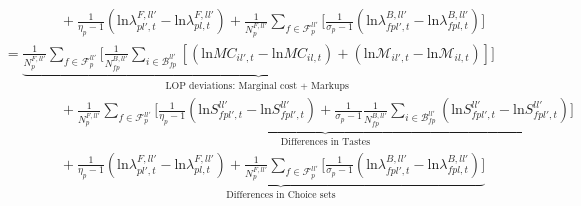 \begin{linenomath*}
\begin{equation*}
\begin{aligned}
            & \qquad \qquad
                +   \frac{1}{\eta_p-1} 
                        \left(\text{ln} \lambda^{F,ll'}_{pl',t} - \text{ln}\lambda^{F,ll'}_{pl,t} \right)
                    + \frac{1}{N^{F,ll'}_{p}} \sum_{f \in \mathcal{F}^{ll'}_{p}} 
                    \Bigg[
                        \frac{1}{\sigma_p-1} 
                        \left(\text{ln} \lambda^{B,ll'}_{fpl',t} - \text{ln}\lambda^{B,ll'}_{fpl,t} \right)  
                    \Bigg] \\
            &=  \underbrace{\frac{1}{N^{F,ll'}_{p}} \sum_{f \in \mathcal{F}^{ll'}_{p}} 
                    \Bigg[
                        \frac{1}{N^{B,ll'}_{fp}} \sum_{i \in \mathcal{B}^{ll'}_{fp}} 
                        \left[
                            \left(\text{ln}MC_{il',t} - \text{ln}MC_{il,t}\right) +
                            \left(\text{ln}\mathcal{M}_{il',t} - \text{ln}\mathcal{M}_{il,t}\right)
                        \right]
                    \Bigg]}_{\text{LOP deviations: Marginal cost + Markups }} \\
                & \qquad \qquad
                    +   \underbrace{\frac{1}{N^{F,ll'}_{p}} \sum_{f \in \mathcal{F}^{ll'}_{p}}
                        \Bigg[ 
                            \frac{1}{\eta_p-1} 
                            \left(\text{ln}S^{ll'}_{fpl',t} - \text{ln}S^{ll'}_{fpl',t} \right)
                            + \frac{1}{\sigma_p-1} 
                            \frac{1}{N^{B,ll'}_{fp}} \sum_{i \in \mathcal{B}^{ll'}_{fp}} 
                            \left(\text{ln}S^{ll'}_{fpl',t} - \text{ln}S^{ll'}_{fpl',t} \right)
                        \Bigg]}_{\text{Differences in Tastes}} \\
                & \qquad \qquad
                    +   \underbrace{
                        \frac{1}{\eta_p-1} 
                            \left(\text{ln} \lambda^{F,ll'}_{pl',t} - \text{ln}\lambda^{F,ll'}_{pl,t} \right)
                        + \frac{1}{N^{F,ll'}_{p}} \sum_{f \in \mathcal{F}^{ll'}_{p}} 
                        \Bigg[
                            \frac{1}{\sigma_p-1} 
                            \left(\text{ln} \lambda^{B,ll'}_{fpl',t} - \text{ln}\lambda^{B,ll'}_{fpl,t} \right)  
                        \Bigg]}_{\text{Differences in Choice sets}}    
    \end{aligned}
\end{equation*}
\end{linenomath*}

